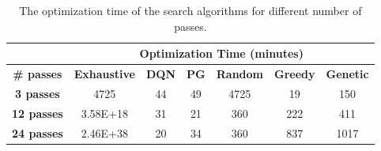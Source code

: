 
\begin{table}[!t]
\caption{The optimization time of the search algorithms for different number of passes.}
\vspace{-0.2cm}
\label{tab:runtime}
\begin{tabular}{|c|c|c|c|c|c|c|}
\hline
\textbf{}          & \multicolumn{6}{c|}{\textbf{Optimization Time (minutes)}}                                                                                           \\ \hline
\textbf{\hspace{-1.2mm}\# passes\hspace{-1.2mm}} & \textbf{\hspace{-1.2mm}Exhaustive\hspace{-1.2mm}} & \textbf{\hspace{-1.2mm}DQN\hspace{-1.2mm}} & \textbf{PG} & \textbf{\hspace{-1.2mm}Random\hspace{-1.2mm}} & \textbf{\hspace{-1.2mm}Greedy\hspace{-1.2mm}} & \textbf{\hspace{-1.2mm}Genetic\hspace{-1.2mm}} \\ \hline
\textbf{3 passes}  & 4725                & 44           & 49                & 4725            & 19              & 150                       \\ \hline
\textbf{12 passes} & 3.58E+18            & 31           & 21                & 360             & 222             & 411                      \\ \hline
\textbf{24 passes} & 2.46E+38            & 20           & 34             & 360             & 837             & 1017                    \\ \hline
\end{tabular}
\vspace{-0.5cm}
\end{table}


